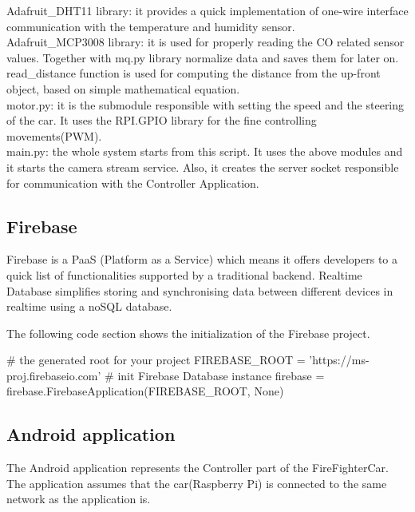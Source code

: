 \documentclass[a4paper,11pt]{article}
\begin{document}
Adafruit\_DHT11 library: it provides a quick implementation of one-wire interface communication with the temperature and humidity sensor.\\

Adafruit\_MCP3008 library: it is used for properly reading the CO related sensor values. Together with mq.py library normalize data and saves them for later on.\\

read\_distance function is used for computing the distance from the up-front object, based on simple mathematical equation.\\

motor.py: it is the submodule responsible with setting the speed and the steering of the car. It uses the RPI.GPIO library for the fine controlling movements(PWM).\\

main.py: the whole system starts from this script. It uses the above modules and it starts the camera stream service. Also, it creates the server socket responsible for communication with the Controller Application.\\

\subsection{Firebase}
Firebase is a PaaS (Platform as a Service) which means it offers developers to a quick list of functionalities supported by a traditional backend.
Realtime Database simplifies storing and synchronising data between different devices in realtime using a noSQL database.

The following code section shows the initialization of the Firebase project.

\begin{python}
# the generated root for your project
FIREBASE_ROOT = 'https://ms-proj.firebaseio.com'
# init Firebase Database instance
firebase = firebase.FirebaseApplication(FIREBASE_ROOT, None)
\end{python}

\subsection{Android application}
The Android application represents the Controller part of the FireFighterCar. The application assumes that the car(Raspberry Pi) is connected to the same network as the application is.\\
\end{document}
